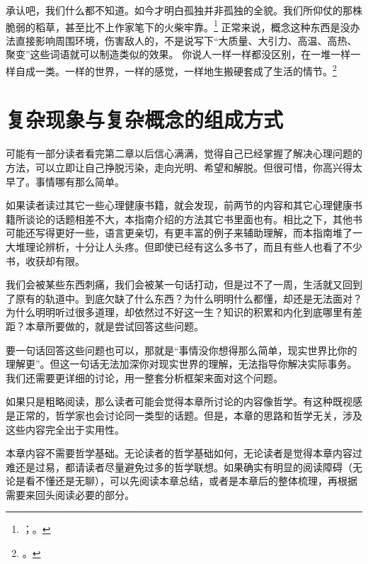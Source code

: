 \begin{savequote}[450pt]
    承认吧，我们什么都不知道。如今才明白孤独并非孤独的全貌。我们所仰仗的那株脆弱的稻草，甚至比不上作家笔下的火柴牢靠。\footnote{；。}
    正常来说，概念这种东西是没办法直接影响周围环境，伤害敌人的，不是说写下“大质量、大引力、高温、高热、聚变”这些词语就可以制造类似的效果。
    你说人一样一样都没区别，在一堆一样一样自成一类。一样的世界，一样的感觉，一样地生搬硬套成了生活的情节。\footnote{。}
\end{savequote}
\chapter{复杂现象与复杂概念的组成方式}

可能有一部分读者看完第二章以后信心满满，觉得自己已经掌握了解决心理问题的方法，可以立即让自己挣脱污染，走向光明、希望和解脱。但很可惜，你高兴得太早了。事情哪有那么简单。

如果读者读过其它一些心理健康书籍，就会发现，前两节的内容和其它心理健康书籍所谈论的话题相差不大，本指南介绍的方法其它书里面也有。相比之下，其他书可能还写得更好一些，语言更亲切，有更丰富的例子来辅助理解，而本指南堆了一大堆理论辨析，十分让人头疼。但即使已经有这么多书了，而且有些人也看了不少书，收获却有限。

\label{para:假性成长}我们会被某些东西刺痛，我们会被某一句话打动，但是过不了一周，生活就又回到了原有的轨道中。到底欠缺了什么东西？为什么明明什么都懂，却还是无法面对？为什么明明听过很多道理，却依然过不好这一生？知识的积累和内化到底哪里有差距？本章所要做的，就是尝试回答这些问题。

要一句话回答这些问题也可以，那就是“事情没你想得那么简单，现实世界比你的理解更”。但这一句话无法加深你对现实世界的理解，无法指导你解决实际事务。我们还需要更详细的讨论，用一整套分析框架来面对这个问题。
\begin{explain}
如果只是粗略阅读，那么读者可能会觉得本章所讨论的内容像哲学。有这种既视感是正常的，哲学家也会讨论同一类型的话题。但是，本章的思路和哲学无关，涉及这些内容完全出于实用性。

本章内容不需要哲学基础。无论读者的哲学基础如何，无论读者是觉得本章内容过难还是过易，都请读者尽量避免过多的哲学联想。如果确实有明显的阅读障碍（无论是看不懂还是无聊），可以先阅读本章总结，或者是本章后的整体梳理，再根据需要来回头阅读必要的部分。
\end{explain}

